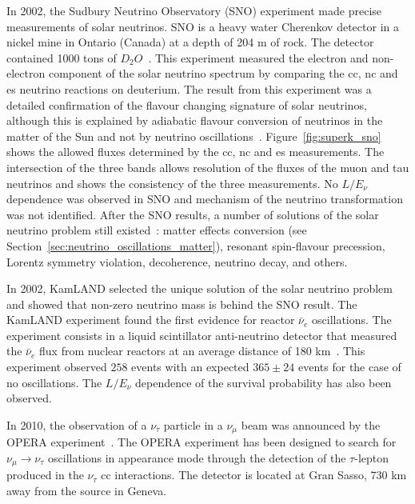 In 2002, the Sudbury Neutrino Observatory (SNO) experiment made precise measurements of solar neutrinos. SNO is a heavy water Cherenkov detector in a nickel mine in Ontario (Canada) at a depth of 204 m of rock. The detector contained 1000 tons of $D_2O$~\cite{sno}. This experiment measured the electron and non-electron component of the solar neutrino spectrum by comparing the \acrfull{cc}, \acrfull{nc} and \acrfull{es} neutrino reactions on deuterium. 
The result from this experiment was a detailed confirmation of the flavour changing signature of solar neutrinos, although this is explained by adiabatic flavour conversion of neutrinos in the matter of the Sun and not by neutrino oscillations~\cite{Smirnov:2016xzf}.
Figure~\ref{fig:superk_sno} shows the allowed fluxes determined by the \acrshort{cc}, \acrshort{nc} and \acrshort{es} measurements. The intersection of the three bands allows resolution of the fluxes of the muon and tau neutrinos and shows the consistency of the three measurements.
%
No $L/E_\nu$ dependence was observed in SNO and mechanism of the neutrino transformation was  not identified. After the SNO results, a number of solutions of the solar neutrino problem still existed~\cite{Smirnov:2016xzf}: matter effects conversion (see Section~\ref{sec:neutrino_oscillations_matter}), resonant spin-flavour precession, Lorentz symmetry violation, decoherence, neutrino decay, and others.

In 2002, KamLAND selected the unique solution of the solar neutrino problem and showed that non-zero neutrino mass is behind the SNO result. The KamLAND experiment found the first evidence for reactor $\bar{\nu}_e$ oscillations. The experiment consists in a liquid scintillator anti-neutrino detector that measured the $\bar{\nu}_e$ flux from nuclear reactors at an average distance of 180 km~\cite{kamland}. 
This experiment observed $258$ events with an expected $365 \pm 24$ events for the case of no oscillations. The $L/E_\nu$ dependence of the survival probability has also been observed. 

In 2010, the observation of a $\nu_\tau$ particle in a $\nu_\mu$ beam was announced by the OPERA experiment~\cite{OPERA}. The OPERA experiment has been designed to search for $\nu_\mu \rightarrow \nu_\tau$ oscillations in appearance mode through the detection of the $\tau$-lepton produced in the $\nu_\tau$ \acrshort{cc} interactions. The detector is located at Gran Sasso, 730 km away from the source in Geneva. \\




